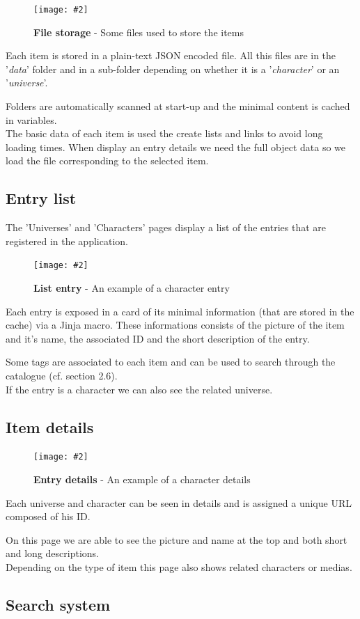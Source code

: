 \documentclass[10pt, a4paper]{article}
\newcommand{\figuremacro}[5]{
    \begin{figure}[#1]
        \centering
        \texttt{[image: \#2]}
        \caption[#3]{\textbf{#3}#4}
        \label{fig:#2}
    \end{figure}
}
\begin{document}
	\figuremacro{h}{JsonFiles}{File storage}{ - Some files used to store the items}{0.13}
	
	Each item is stored in a plain-text JSON encoded file. All this files are in the '\textit{data}' folder and in a sub-folder depending on whether it is a '\textit{character}' or an '\textit{universe}'.
	
	Folders are automatically scanned at start-up and the minimal content is cached in variables. \\
	The basic data of each item is used the create lists and links to avoid long loading times.
	When display an entry details we need the full object data so we load the file corresponding to the selected item.
	
	\subsection{Entry list}
	The 'Universes' and 'Characters' pages display a list of the entries that are registered in the application.
	
	\figuremacro{h}{CharacterEntry}{List entry}{ - An example of a character entry}{0.8}
	
	Each entry is exposed in a card of its minimal information (that are stored in the cache) via a Jinja macro. These informations consists of the picture of the item and it's name, the associated ID and the short description of the entry.
	
	Some tags are associated to each item and can be used to search through the catalogue (cf. section 2.6). \\
	If the entry is a character we can also see the related universe.
	
	\subsection{Item details}
	
	\figuremacro{h}{CharacterDetails}{Entry details}{ - An example of a character details}{0.6}
	
	Each universe and character can be seen in details and is assigned a unique URL composed of his ID.
	
	On this page we are able to see the picture and name at the top and both short and long descriptions.\\
	Depending on the type of item this page also shows related characters or medias.
	
	\subsection{Search system}
	
\end{document}
